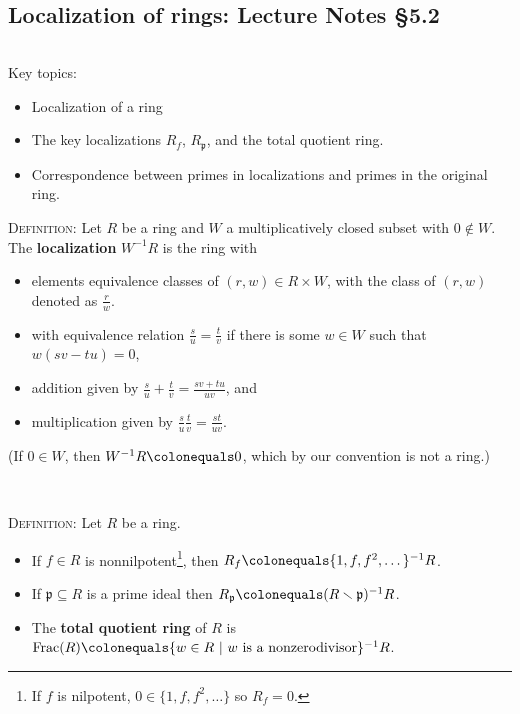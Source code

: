 \documentclass[12pt]{amsart}
\newcommand{\p}{\mathfrak{p}}
\newcommand{\0}{$\phantom{.}$}
\newcommand{\1}{\mathbbm{1}}
\newcommand{\ds}{\displaystyle}
\newcommand\ceq{\colonequals}
\begin{document}
\newpage

\subsection{Localization of rings: Lecture Notes \S5.2} \0

\begin{framed} Key topics:
\begin{itemize}
\item Localization of a ring
\item The key localizations $R_f$, $R_{\p}$, and the total quotient ring.
\item Correspondence between primes in localizations and primes in  the original ring.
\end{itemize}
\end{framed}

\noindent \textsc{Definition:} Let $R$ be a ring and $W$ a multiplicatively closed subset with $0\notin W$. The \textbf{localization} $W^{-1}R$ is the ring with
\begin{itemize}
\item  elements  equivalence classes of $(r,w)\in R\times W$, with the class of $(r,w)$ denoted as $\ds \frac{r}{w}$.
\smallskip
\item with equivalence relation $\ds \frac{s}{u} = \frac{t}{v}$ if there is some $w\in W$ such that $w(sv-tu)=0$,
\smallskip
\item addition given by $\ds\frac{s}{u} + \frac{t}{v} = \frac{sv+tu}{uv}$, and
\smallskip
\item multiplication given by $\ds\frac{s}{u}  \frac{t}{v} = \frac{st}{uv}$.
\end{itemize}
(If $0\in W$, then $W^{-1}R\ceq 0$, which by our convention is not a ring.)

\

\noindent \textsc{Definition:} Let $R$ be a ring.
\begin{itemize}
\item If $f\in R$ is nonnilpotent\footnote{If $f$ is nilpotent, $0\in \{1,f,f^2,\dots\}$ so $R_f=0$.}, then $R_f \ceq \{1,f,f^2,\dots\}^{-1} R$.
\item If $\p \subseteq R$ is a prime ideal then $R_{\p} \ceq (R\smallsetminus \p)^{-1} R$.
\item The \textbf{total quotient ring} of $R$ is $\mathrm{Frac}(R)\ceq \{ w\in R \ | \ w \ \text{is a nonzerodivisor}\}^{-1}R$.
\end{itemize}
\end{document}
